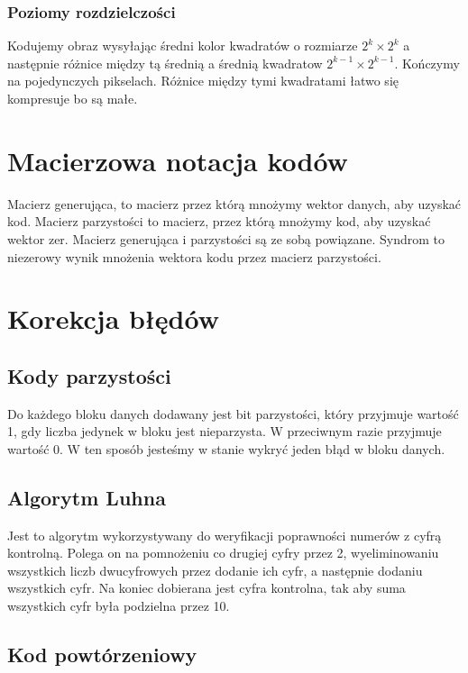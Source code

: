\documentclass{../notatki}
\begin{document}
\subsubsection{Poziomy rozdzielczości}

Kodujemy obraz wysyłając średni kolor kwadratów o rozmiarze $2^k \times 2^k$
a następnie różnice między tą średnią a średnią kwadratow $2^{k-1}
\times 2^{k-1}$. Kończymy na pojedynczych pikselach. Różnice między tymi
kwadratami łatwo się kompresuje bo są małe.

\section{Macierzowa notacja kodów}

Macierz generująca, to macierz przez którą mnożymy wektor danych, aby uzyskać
kod. Macierz parzystości to macierz, przez którą mnożymy kod, aby uzyskać
wektor zer. Macierz generująca i parzystości są ze sobą powiązane.
Syndrom to niezerowy wynik mnożenia wektora kodu przez macierz parzystości.

\section{Korekcja błędów}

\subsection{Kody parzystości}

Do każdego bloku danych dodawany jest bit parzystości, który przyjmuje wartość
1, gdy liczba jedynek w bloku jest nieparzysta. W przeciwnym razie
przyjmuje wartość 0. W ten sposób jesteśmy w stanie wykryć jeden błąd w bloku
danych.

\subsection{Algorytm Luhna}

Jest to algorytm wykorzystywany do weryfikacji poprawności numerów z cyfrą
kontrolną. Polega on na pomnożeniu co drugiej cyfry przez 2, wyeliminowaniu
wszystkich liczb dwucyfrowych przez dodanie ich cyfr, a następnie
dodaniu wszystkich cyfr. Na koniec dobierana jest cyfra kontrolna, tak aby
suma wszystkich cyfr była podzielna przez 10.

\subsection{Kod powtórzeniowy}
\end{document}
